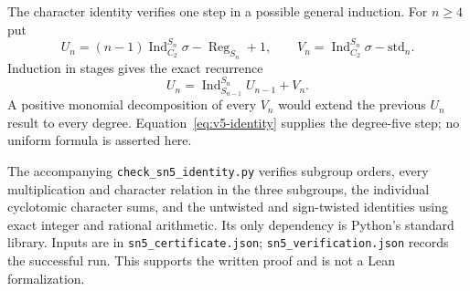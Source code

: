 The character identity verifies one step in a possible general induction.
For $n\geq4$ put
\[
 U_n=(n-1)\operatorname{Ind}_{C_2}^{S_n}\sigma-\operatorname{Reg}_{S_n}+1,
 \qquad
 V_n=\operatorname{Ind}_{C_2}^{S_n}\sigma-\mathrm{std}_n.
\]
Induction in stages gives the exact recurrence
\[
 U_n=\operatorname{Ind}_{S_{n-1}}^{S_n}U_{n-1}+V_n.
\]
A positive monomial decomposition of every $V_n$ would extend the
previous $U_n$ result to every degree. Equation~\eqref{eq:v5-identity}
supplies the degree-five step; no uniform formula is asserted here.

The accompanying \texttt{check\_sn5\_identity.py} verifies subgroup
orders, every multiplication and character relation in the three
subgroups, the individual cyclotomic character sums, and the untwisted
and sign-twisted identities using exact integer and rational arithmetic.
Its only dependency is Python's standard library.
Inputs are in \texttt{sn5\_certificate.json};
\texttt{sn5\_verification.json} records the successful run.
This supports the written proof and is not a Lean formalization.
